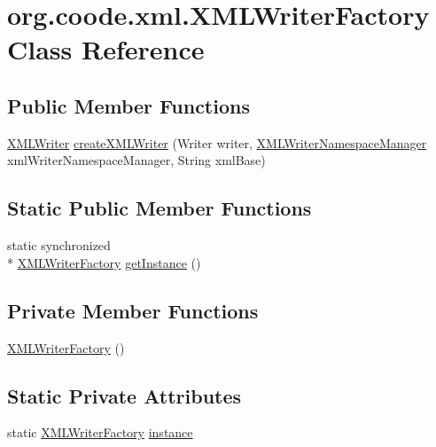\hypertarget{classorg_1_1coode_1_1xml_1_1_x_m_l_writer_factory}{\section{org.\-coode.\-xml.\-X\-M\-L\-Writer\-Factory Class Reference}
\label{classorg_1_1coode_1_1xml_1_1_x_m_l_writer_factory}
}
\subsection*{Public Member Functions}
\begin{DoxyCompactItemize}
\item 
\hyperlink{interfaceorg_1_1coode_1_1xml_1_1_x_m_l_writer}{X\-M\-L\-Writer} \hyperlink{classorg_1_1coode_1_1xml_1_1_x_m_l_writer_factory_abbfbfd5e8f6eb7f62fd187a989d2e044}{create\-X\-M\-L\-Writer} (Writer writer, \hyperlink{classorg_1_1coode_1_1xml_1_1_x_m_l_writer_namespace_manager}{X\-M\-L\-Writer\-Namespace\-Manager} xml\-Writer\-Namespace\-Manager, String xml\-Base)
\end{DoxyCompactItemize}
\subsection*{Static Public Member Functions}
\begin{DoxyCompactItemize}
\item 
static synchronized \\*
\hyperlink{classorg_1_1coode_1_1xml_1_1_x_m_l_writer_factory}{X\-M\-L\-Writer\-Factory} \hyperlink{classorg_1_1coode_1_1xml_1_1_x_m_l_writer_factory_ad37ff4ed3afc6bc1b1797e439eb7f1f3}{get\-Instance} ()
\end{DoxyCompactItemize}
\subsection*{Private Member Functions}
\begin{DoxyCompactItemize}
\item 
\hyperlink{classorg_1_1coode_1_1xml_1_1_x_m_l_writer_factory_a0b69770cd36da2e8e3902757210a1619}{X\-M\-L\-Writer\-Factory} ()
\end{DoxyCompactItemize}
\subsection*{Static Private Attributes}
\begin{DoxyCompactItemize}
\item 
static \hyperlink{classorg_1_1coode_1_1xml_1_1_x_m_l_writer_factory}{X\-M\-L\-Writer\-Factory} \hyperlink{classorg_1_1coode_1_1xml_1_1_x_m_l_writer_factory_ad944a1b44454b51ede73c1e7544e3114}{instance}
\end{DoxyCompactItemize}


